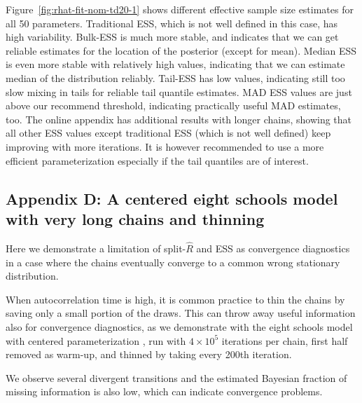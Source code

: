 \documentclass[american,]{article}
\theoremstyle{definition}
\begin{document}
Figure~\ref{fig:rhat-fit-nom-td20-1} shows different effective sample
size estimates for all 50 parameters. Traditional ESS, which is not well
defined in this case, has high variability. Bulk-ESS is much more
stable, and indicates that we can get reliable estimates for the
location of the posterior (except for mean). Median ESS is even more
stable with relatively high values, indicating that we can estimate
median of the distribution reliably. Tail-ESS has low values,
indicating still too slow mixing in tails for reliable tail quantile
estimates. MAD ESS values are just above our recommend threshold,
indicating practically useful MAD estimates, too. The online appendix
has additional results with longer chains, showing that all other ESS
values except traditional ESS (which is not well defined) keep improving
with more iterations. It is however recommended to use a more efficient
parameterization especially if the tail quantiles are of
interest.


\hypertarget{a-centered-eight-schools-model-1}{%
\subsection*{Appendix D: A centered eight schools model with very long chains and
thinning}\label{a-centered-eight-schools-model-1}}


Here we demonstrate a limitation of split-\(\widehat{R}\) and ESS as
convergence diagnostics in a case where the chains eventually converge
to a common wrong stationary distribution.

When autocorrelation time is high, it is common practice to thin the
chains by saving only a small portion of the draws. This can throw
away useful information also for convergence diagnostics, as we demonstrate with the
eight schools model with centered parameterization , run with $4\times 10^5$
iterations per chain, first half removed as warm-up, and thinned by taking every 200th iteration.

We observe several divergent transitions and the estimated Bayesian
fraction of missing information \citep{betancourt2017conceptual} is
also low, which can indicate convergence problems.
\end{document}
